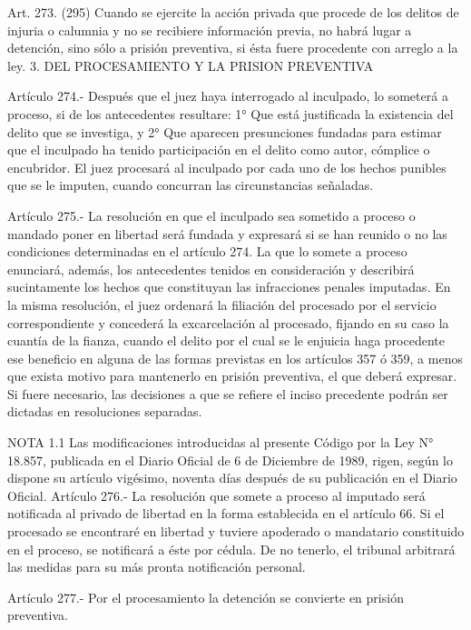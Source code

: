     Art. 273. (295) Cuando se ejercite la acción privada que procede de los delitos de injuria o calumnia y no se recibiere información previa, no habrá lugar a detención, sino sólo a prisión preventiva, si ésta fuere procedente con arreglo a la ley.
  3. DEL PROCESAMIENTO Y LA PRISION PREVENTIVA


    Artículo 274.- Después que el juez haya interrogado al inculpado, lo someterá a proceso, si de los antecedentes resultare:
      1° Que está justificada la existencia del delito que se investiga, y
    2° Que aparecen presunciones fundadas para estimar que el inculpado ha tenido participación en el delito como autor, cómplice o encubridor.
    El juez procesará al inculpado por cada uno de los hechos punibles que se le imputen, cuando concurran las circunstancias señaladas.

    Artículo 275.- La resolución en que el inculpado sea sometido a proceso o mandado poner en libertad será fundada y expresará si se han reunido o no las condiciones determinadas en el  artículo 274.
    La que lo somete a proceso enunciará, además, los antecedentes tenidos en consideración y describirá sucintamente los hechos que constituyan las infracciones penales imputadas.
    En la misma resolución, el juez ordenará la filiación del procesado por el servicio correspondiente y concederá la excarcelación al procesado, fijando en su caso la cuantía de la fianza, cuando el delito por el cual se le enjuicia haga procedente ese beneficio en alguna de las formas previstas en los artículos 357 ó 359, a menos que exista motivo para mantenerlo en prisión preventiva, el que deberá expresar.
    Si fuere necesario, las decisiones a que se refiere el inciso precedente podrán ser dictadas en resoluciones separadas.




NOTA 1.1
      Las modificaciones introducidas al presente Código por la Ley N° 18.857, publicada en el Diario Oficial de 6 de Diciembre de 1989, rigen, según lo dispone su artículo vigésimo, noventa días después de su publicación en el Diario Oficial.
    Artículo 276.- La resolución que somete a proceso al imputado será notificada al privado de libertad en la forma establecida en el artículo 66.
    Si el procesado se encontraré en libertad y tuviere apoderado o mandatario constituido en el proceso, se notificará a éste por cédula. De no tenerlo, el tribunal arbitrará las medidas para su más pronta notificación personal.

    Artículo 277.- Por el procesamiento la detención se convierte en prisión preventiva.


